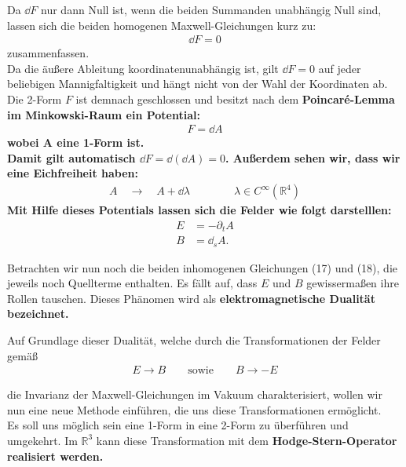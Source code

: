 Da $\dd F$ nur dann Null ist, wenn die beiden Summanden unabhängig Null sind, lassen sich die beiden homogenen Maxwell-Gleichungen kurz zu: 
\begin{align}
\dd F = 0
\end{align}
zusammenfassen. \\
Da die äußere Ableitung koordinatenunabhängig ist, gilt $\dd F = 0$ auf jeder beliebigen Mannigfaltigkeit und hängt nicht von der Wahl der Koordinaten ab. \\
Die 2-Form $F$ ist demnach geschlossen und besitzt nach dem \bfseries Poincaré-Lemma \normalfont im Minkowski-Raum ein Potential:
\begin{align}
F = \dd A 
\end{align}
wobei A eine 1-Form ist. \\
Damit gilt automatisch $ \dd F = \dd (\dd A) = 0$. Außerdem sehen wir, dass wir eine Eichfreiheit haben:
\begin{align}
A \quad \rightarrow \quad A + \dd \lambda \qquad\qquad \lambda \in C^{\infty}(\mathbb{R}^4)
\end{align}
Mit Hilfe dieses Potentials lassen sich die Felder wie folgt darstelllen:
\begin{align}
E &= -\partial_t A \\
B &= \dd_s A.
\end{align}

Betrachten wir nun noch die beiden inhomogenen Gleichungen (17) und (18), die jeweils noch Quellterme enthalten. Es fällt auf, dass $E$ und $B$ gewissermaßen ihre Rollen tauschen. Dieses Phänomen wird als \bfseries elektromagnetische Dualität \normalfont bezeichnet.

Auf Grundlage dieser Dualität, welche durch die Transformationen der Felder gemäß
\begin{align*}
E \rightarrow B \qquad \text{sowie} \qquad B \rightarrow -E
\end{align*}

die Invarianz der Maxwell-Gleichungen im Vakuum charakterisiert, wollen wir nun eine neue Methode einführen, die uns diese Transformationen ermöglicht. \\
Es soll uns möglich sein eine 1-Form in eine 2-Form zu überführen und umgekehrt. Im $\mathbb{R}^3$ kann diese Transformation mit dem \bfseries Hodge-Stern-Operator \normalfont realisiert werden.
